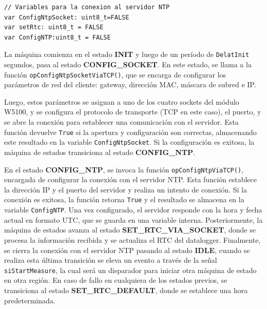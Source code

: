 \begin{lstlisting}[style=yakindustyle, caption={Declaración de variables booleanas para validar la conexion con el servidor NTP.}, label=cdg:serRTC,basicstyle=\ttfamily\fontsize{8}{8}\selectfont]
// Variables para la conexion al servidor NTP
var ConfigNtpSocket: uint8_t=FALSE
var setRtc: uint8_t = FALSE
var ConfigNTP:uint8_t = FALSE
\end{lstlisting}

La máquina comienza en el estado \textbf{INIT} y luego de un período de \texttt{DelatInit} segundos, pasa al estado \textbf{CONFIG\_SOCKET}. En este estado, se llama a la función \texttt{opConfigNtpSocketViaTCP()}, que se encarga de configurar los parámetros de red del cliente: gateway, dirección MAC, máscara de subred e IP. 

Luego, estos parámetros se asignan a uno de los cuatro sockets del módulo W5100, y se configura el protocolo de transporte (TCP en este caso), el puerto, y se abre la conexión para establecer una comunicación con el servidor. Esta función devuelve \texttt{True} si la apertura y configuración son correctas, almacenando este resultado en la variable \texttt{ConfigNtpSocket}. Si la configuración es exitosa, la máquina de estados transiciona al estado \textbf{CONFIG\_NTP}.

En el estado \textbf{CONFIG\_NTP}, se invoca la función \texttt{opConfigNtpViaTCP()}, encargada de configurar la conexión con el servidor NTP. Esta función establece la dirección IP y el puerto del servidor y realiza un intento de conexión. Si la conexión es exitosa, la función retorna \texttt{True} y el resultado se almacena en la variable \texttt{ConfigNTP}. Una vez configurado, el servidor responde con la hora y fecha actual en formato UTC, que se guarda en una variable interna. Posteriormente, la máquina de estados avanza al estado \textbf{SET\_RTC\_VIA\_SOCKET}, donde se procesa la información recibida y se actualiza el RTC del datalogger. Finalmente, se cierra la conexión con el servidor NTP pasando al estado \textbf{IDLE}, cuando se realiza esta última transición se eleva un evento a través de la señal \texttt{siStartMeasure}, la cual será un disparador para iniciar otra máquina de estado en otra región. En caso de fallo en cualquiera de los estados previos, se transiciona al estado \textbf{SET\_RTC\_DEFAULT}, donde se establece una hora predeterminada.

